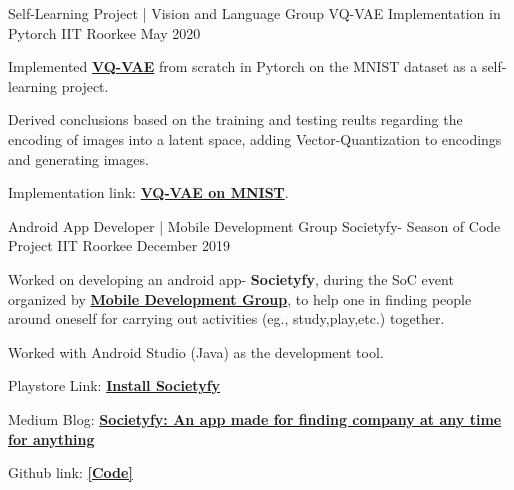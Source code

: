 \begin{cventries}
\cventry
    {Self-Learning Project | Vision and Language Group} %
    {VQ-VAE Implementation in Pytorch} %
    {IIT Roorkee} %
    {May 2020} %
    {
      \begin{cvitems} %
        \item {Implemented \href{https://arxiv.org/abs/1711.00937}{\bf VQ-VAE} from scratch in Pytorch on the MNIST dataset as a self-learning project.}
        \item {Derived conclusions based on the training and testing reults regarding the encoding of images into a latent space, adding Vector-Quantization to encodings and generating images.}
        \item {Implementation link: {\href{https://github.com/praeclarumjj3/VQ-VAE-on-MNIST}{\bf VQ-VAE on MNIST}}.}
      \end{cvitems}
    }
      

\cventry
    {Android App Developer | Mobile Development Group } %
    {Societyfy- Season of Code Project} %
    {IIT Roorkee} %
    {December 2019} %
    {
      \begin{cvitems} %
        \item {Worked on developing an android app- \textbf{Societyfy}, during the SoC event organized by \href{https://mdg.iitr.ac.in/}{\bf Mobile Development Group}, to help one in finding people around oneself for carrying out activities (eg., study,play,etc.) together.}
        \item{Worked with Android Studio (Java) as the development tool.}
        \item {Playstore Link: \href{https://play.google.com/store/apps/details?id=in.ac.mdg.iitr.societyfy}{\bf Install Societyfy}}
        \item {Medium Blog: \href{https://medium.com/mobile-development-group/societyfy-an-app-made-for-finding-company-at-anytime-for-anything-842e18151551}{\bf Societyfy: An app made for finding company at any time for anything}}
        \item {Github link: \href{https://github.com/praeclarumjj3/SOCIETYFY}{\bf [Code]}}
      \end{cvitems}
    }

\end{cventries}
